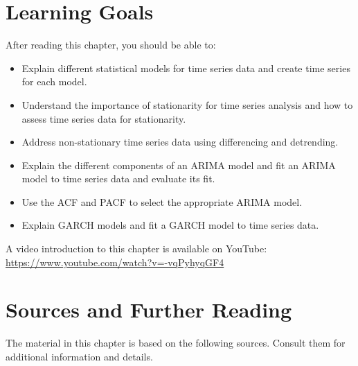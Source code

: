 %
%
\section*{Learning Goals}

After reading this chapter, you should be able to:
\begin{itemize}
   \item Explain different statistical models for time series data and create time series for each model.
   \item Understand the importance of stationarity for time series analysis and how to assess time series data for stationarity.
   \item Address non-stationary time series data using differencing and detrending.
   \item Explain the different components of an ARIMA model and fit an ARIMA model to time series data and evaluate its fit. 
   \item Use the ACF and PACF to select the appropriate ARIMA model.
   \item Explain GARCH models and fit a GARCH model to time series data.
\end{itemize}

\begin{advanced}
\begin{videobox}
A video introduction to this chapter is available on YouTube:\\

\url{https://www.youtube.com/watch?v=-vqPyhyqGF4}
\end{videobox}
\end{advanced}

\section*{Sources and Further Reading}

The material in this chapter is based on the following sources. Consult them for additional information and details.

